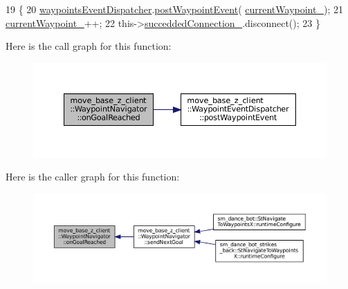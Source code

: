 \begin{DoxyCode}
19 \{
20   \hyperlink{classmove__base__z__client_1_1WaypointNavigator_a488a89db6cd20bc12548ac454254829f}{waypointsEventDispatcher}.\hyperlink{classmove__base__z__client_1_1WaypointEventDispatcher_a7421f1eb8aae15a3ddde7c50bea87648}{postWaypointEvent}(
      \hyperlink{classmove__base__z__client_1_1WaypointNavigator_a7da763128724f7b08c32c79cb3a88934}{currentWaypoint\_});
21   \hyperlink{classmove__base__z__client_1_1WaypointNavigator_a7da763128724f7b08c32c79cb3a88934}{currentWaypoint\_}++;
22   this->\hyperlink{classmove__base__z__client_1_1WaypointNavigator_a139d492345875777d9c9a79f9b2d494b}{succeddedConnection\_}.disconnect();
23 \}
\end{DoxyCode}
Here is the call graph for this function\+:
\nopagebreak
\begin{figure}[H]
\begin{center}
\leavevmode
\includegraphics[width=350pt]{classmove__base__z__client_1_1WaypointNavigator_ae4c5a879ff016f197c1cec54b2adaa1b_cgraph}
\end{center}
\end{figure}
Here is the caller graph for this function\+:
\nopagebreak
\begin{figure}[H]
\begin{center}
\leavevmode
\includegraphics[width=350pt]{classmove__base__z__client_1_1WaypointNavigator_ae4c5a879ff016f197c1cec54b2adaa1b_icgraph}
\end{center}
\end{figure}
\mbox{\label{classmove__base__z__client_1_1WaypointNavigator_afef3c44c7c21d279be8cd9a404bf3bfc}} 
